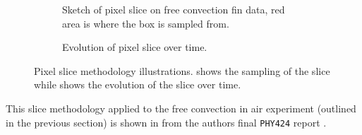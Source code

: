 \documentclass[aip, cp, amsmath, amssymb, reprint, nofootinbib]{revtex4-2}
\begin{document}
        \begin{figure}[H]
            \centering
            \begin{subfigure}{0.49\linewidth}
                \centering
                \scalebox{1.2}{
                }
                \caption{Sketch of pixel slice on free convection fin data, red area is where the box is sampled from.}
                \label{fig:slice-1}
            \end{subfigure}
            \begin{subfigure}{0.49\linewidth}
                \centering
                \scalebox{1.2}{
                }
                \caption{Evolution of pixel slice over time.}
                \label{fig:slice-2}
            \end{subfigure}
            \caption{Pixel slice methodology illustrations.  shows the sampling of the slice while  shows the evolution of the slice over time.}
        \end{figure}

        This slice methodology applied to the free convection in air experiment (outlined in the previous section) is shown in  from the authors final \texttt{PHY424} report \cite{adi}.

\end{document}
